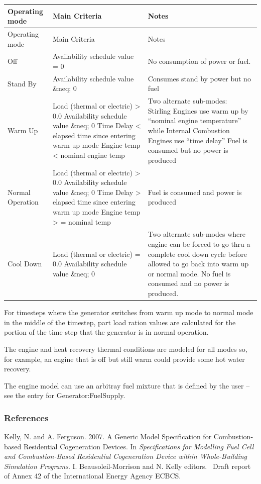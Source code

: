 \begin{longtable}[c]{p{1.5in}p{2.05in}p{2.44in}}
\toprule 
Operating mode & Main Criteria & Notes \tabularnewline
\midrule
\endfirsthead

\toprule 
Operating mode & Main Criteria & Notes \tabularnewline
\midrule
\endhead

Off & Availability schedule value = 0 & No consumption of power or fuel. \tabularnewline
Stand By & Availability schedule value  \&neq;  0 & Consumes stand by power but no fuel \tabularnewline
Warm Up & Load (thermal or electric)  >  0.0 Availability schedule value  \&neq;  0 Time Delay  <  elapsed time since entering warm up mode Engine temp  <  nominal engine temp & Two alternate sub-modes:~ Stirling Engines use warm up by “nominal engine temperature” while Internal Combustion Engines use “time delay” Fuel is consumed but no power is produced \tabularnewline
Normal Operation & Load (thermal or electric)  >  0.0 Availability schedule value  \&neq;  0 Time Delay  >  elapsed time since entering warm up mode Engine temp  > = nominal temp & Fuel is consumed and power is produced \tabularnewline
Cool Down & Load (thermal or electric) = 0.0 Availability schedule value  \&neq;  0 & Two alternate sub-modes where engine can be forced to go thru a complete cool down cycle before allowed to go back into warm up or normal mode. No fuel is consumed and no power is produced. \tabularnewline
\bottomrule
\end{longtable}

For timesteps where the generator switches from warm up mode to normal mode in the middle of the timestep, part load ration values are calculated for the portion of the time step that the generator is in normal operation.

The engine and heat recovery thermal conditions are modeled for all modes so, for example, an engine that is off but still warm could provide some hot water recovery.

The engine model can use an arbitray fuel mixture that is defined by the user -- see the entry for Generator:FuelSupply.

\subsubsection{References}\label{references-024}

Kelly, N. and A. Ferguson. 2007. A Generic Model Specification for Combustion-based Residential Cogeneration Devices. In \emph{Specifications for Modelling Fuel Cell and Combustion-Based Residential Cogeneration Device within Whole-Building Simulation Programs}. I. Beausoleil-Morrison and N. Kelly editors.~ Draft report of Annex 42 of the International Energy Agency ECBCS.

